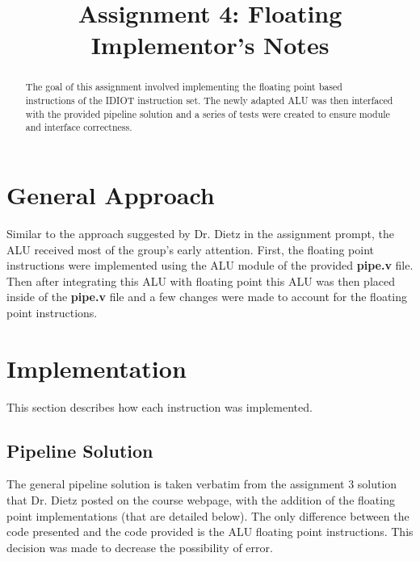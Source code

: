 \documentclass[conference]{IEEEtran}
\begin{document}
\title{Assignment 4: Floating\\Implementor's Notes}
\author{
        }

\maketitle

\begin{abstract}
The goal of this assignment involved implementing the floating point based
instructions of the IDIOT instruction set. The newly adapted ALU was then
interfaced with the provided pipeline solution and a series of tests were created
to ensure module and interface correctness.
\end{abstract}

\section{General Approach}
Similar to the approach suggested by Dr. Dietz in the assignment prompt, the ALU
received most of the group's early attention. First, the floating point instructions were 
implemented using the ALU module of the provided \textbf{pipe.v} file. Then after integrating
this ALU with floating point this ALU was then placed inside of the \textbf{pipe.v} file and a 
few changes were made to account for the floating point instructions.  

\section{Implementation}
This section describes how each instruction was implemented.

\subsection{Pipeline Solution}
The general pipeline solution is taken verbatim from the assignment 3 solution that Dr. Dietz
posted on the course webpage, with the addition of the floating point implementations (that 
are detailed below). The only difference between the code presented and the code provided
is the ALU floating point instructions. This decision was made to decrease the possibility of error. 
\end{document}
